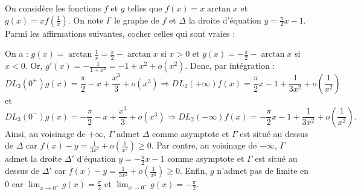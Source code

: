 \begin{question}
On considère les fonctions $f$ et $g$ telles que $\displaystyle f(x)=x\arctan x$ et $\displaystyle g(x)=xf\left(\frac{1}{x}\right)$. On note $\Gamma$ le graphe de $f$ et $\Delta$ la droite d'équation $\displaystyle y=\frac{\pi}{2}x-1$. Parmi les affirmations suivantes, cocher celles qui sont vraies :
\begin{answers}  
\end{answers}
\vskip2mm
\begin{explanations}
On a : $\displaystyle g(x)=\arctan \frac{1}{x}=\frac{\pi}{2}-\arctan x$ si $x>0$ et $\displaystyle g(x)=-\frac{\pi}{2}-\arctan x$ si $x<0$. Or, $\displaystyle g'(x)=-\frac{1}{1+x^2}=-1+x^2+o(x^2)$. Donc, par intégration :
$$DL_3(0^+)g(x)=\frac{\pi}{2}-x+\frac{x^3}{3}+o(x^3)\Rightarrow DL_2(+\infty)f(x)=\frac{\pi}{2}x-1+\frac{1}{3x^2}+o\left(\frac{1}{x^2}\right)$$
et
$$DL_3(0^-)g(x)=-\frac{\pi}{2}-x+\frac{x^3}{3}+o(x^3)\Rightarrow DL_2(-\infty)f(x)=-\frac{\pi}{2}x-1+\frac{1}{3x^2}+o\left(\frac{1}{x^2}\right).$$
Ainsi, au voisinage de $+\infty$, $\Gamma$ admet $\Delta$ comme asymptote et $\Gamma$ est situé au dessus de $\Delta$ car $\displaystyle f(x)-y=\frac{1}{3x^2}+o\left(\frac{1}{x^2}\right)\geq 0$. Par contre, au voisinage de $-\infty$, $\Gamma$ admet la droite $\Delta '$ d'équation $\displaystyle y=-\frac{\pi}{2}x-1$ comme asymptote et $\Gamma$ est situé au dessus de $\Delta '$ car $\displaystyle f(x)-y=\frac{1}{3x^2}+o\left(\frac{1}{x^2}\right)\geq 0$. Enfin, $g$ n'admet pas de limite en $0$ car $\displaystyle \lim _{x\to 0^+}g(x)=\frac{\pi}{2}$ et $\displaystyle \lim _{x\to 0^-}g(x)=-\frac{\pi}{2}$.
\end{explanations}
\end{question}


